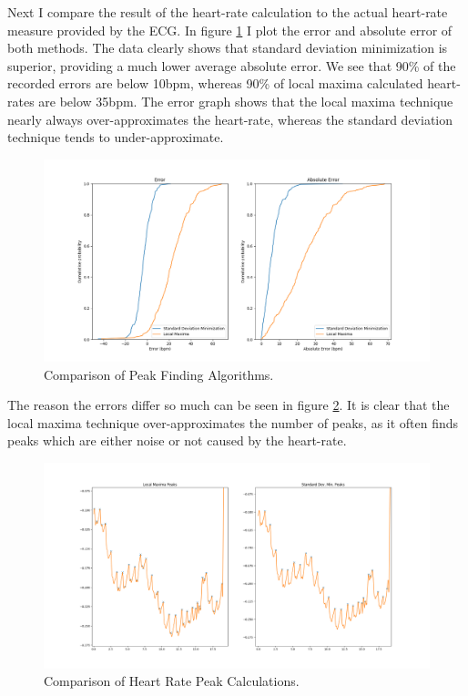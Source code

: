 \documentclass[12pt,a4paper,twoside,openany]{report}
\begin{document}
Next I compare the result of the heart-rate calculation to the actual
heart-rate measure provided by the ECG.
In figure \ref{fig:hrc-error} I plot the error and absolute error of both
methods. The data clearly shows that standard deviation minimization is
superior, providing a much lower average absolute error. We see that 90\% of
the recorded errors are below 10bpm, whereas 90\% of local maxima calculated
heart-rates are below 35bpm. The error graph shows that the local maxima
technique nearly always over-approximates the heart-rate, whereas the standard
deviation technique tends to under-approximate.

\begin{figure}[H]
	\centerline{\includegraphics[width=1\textwidth]{figs/peakfind.png}}
	\caption{Comparison of Peak Finding Algorithms.}
	\label{fig:hrc-error}
\end{figure}

The reason the errors differ so much can be seen in figure
\ref{fig:hr-peak-comparison}. It is clear that the local maxima technique
over-approximates the number of peaks, as it often finds peaks which are
either noise or not caused by the heart-rate.

\begin{figure}[H]
	\centering
	\includegraphics[width=1\textwidth]{figs/peak-comparison.png}
	\caption{Comparison of Heart Rate Peak Calculations.}
	\label{fig:hr-peak-comparison}
\end{figure}
\end{document}
